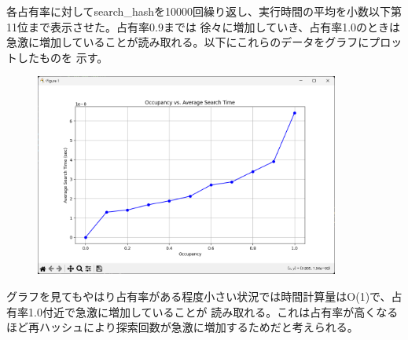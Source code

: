 \documentclass{ltjsarticle}
\begin{document}
各占有率に対してsearch\_hashを10000回繰り返し、実行時間の平均を小数以下第11位まで表示させた。占有率0.9までは
徐々に増加していき、占有率1.0のときは急激に増加していることが読み取れる。以下にこれらのデータをグラフにプロットしたものを
示す。
\begin{figure}[htbp]
\begin{center}
    \includegraphics[width = 100mm]{searchtime.png}
\end{center}
\end{figure}
グラフを見てもやはり占有率がある程度小さい状況では時間計算量はO(1)で、占有率1.0付近で急激に増加していることが
読み取れる。これは占有率が高くなるほど再ハッシュにより探索回数が急激に増加するためだと考えられる。
\end{document}
